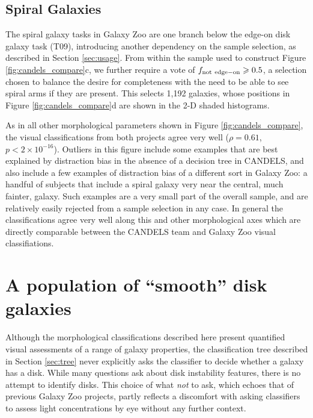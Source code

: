 \documentclass[useAMS,usenatbib]{mn2e}
\begin{document}
{\subsection{Spiral Galaxies}

The spiral galaxy tasks in Galaxy Zoo are one branch below the edge-on disk galaxy task (T09), introducing another dependency on the sample selection, as described in Section \ref{sec:usage}. From within the sample used to construct Figure \ref{fig:candels_compare}c, we further require a vote of $f_{\rm not\ edge-on} \geq 0.5$, a selection chosen to balance the desire for completeness with the need to be able to see spiral arms if they are present. This selects 1,192 galaxies, whose positions in Figure \ref{fig:candels_compare}d are shown in the 2-D shaded histograms. 

As in all other morphological parameters shown in Figure \ref{fig:candels_compare}, the visual classifications from both projects agree very well ($\rho = 0.61$, $p < 2 \times 10^{-16}$). Outliers in this figure include some examples that are best explained by distraction bias in the absence of a decision tree in CANDELS, and also include a few examples of distraction bias of a different sort in Galaxy Zoo: a handful of subjects that include a spiral galaxy very near the central, much fainter, galaxy. Such examples are a very small part of the overall sample, and are relatively easily rejected from a sample selection in any case. In general the classifications agree very well along this and other morphological axes which are directly comparable between the CANDELS team and Galaxy Zoo visual classifiations.







%
%  
\section{A population of ``smooth'' disk galaxies}\label{sec:result}
%
%


Although the morphological classifications described here present quantified visual assessments of a range of galaxy properties, the classification tree described in Section \ref{sec:tree} never explicitly asks the classifier to decide whether a galaxy has a disk. While many questions ask about disk instability features, there is no attempt to identify disks. This choice of what \emph{not} to ask, which echoes that of previous Galaxy Zoo projects, partly reflects a discomfort with asking classifiers to assess light concentrations by eye without any further context. 

}
\end{document}
